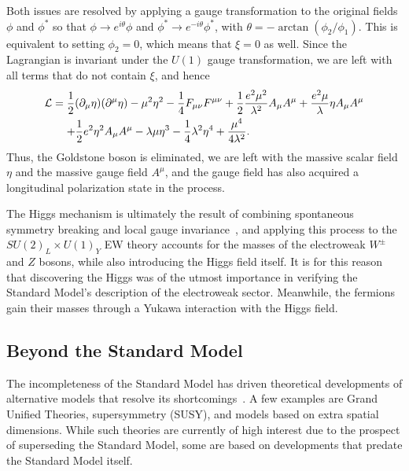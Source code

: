 Both issues are resolved by applying a gauge transformation to the original fields $\phi$ and $\phi^*$ so that $\phi\to e^{i\theta}\phi$ and $\phi^*\to e^{-i\theta}\phi^*$, with $\theta=-\arctan(\phi_2/\phi_1)$.
This is equivalent to setting $\phi_2=0$, which means that $\xi=0$ as well.
Since the Lagrangian is invariant under the $U(1)$ gauge transformation, we are left with all terms that do not contain $\xi$, and hence
\begin{equation}
  \begin{aligned}
    \mathcal{L} &= \frac{1}{2}(\partial_\mu\eta)(\partial^\mu\eta)-\mu^2\eta^2-\frac{1}{4}F_{\mu\nu}F^{\mu\nu}+\frac{1}{2}\frac{e^2\mu^2}{\lambda^2}A_\mu A^\mu+\frac{e^2\mu}{\lambda}\eta A_\mu A^\mu\\
    &\equad+ \frac{1}{2}e^2\eta^2A_\mu A^\mu-\lambda\mu\eta^3-\frac{1}{4}\lambda^2\eta^4+\frac{\mu^4}{4\lambda^2}.
  \end{aligned}
\end{equation}
Thus, the Goldstone boson is eliminated, we are left with the massive scalar field $\eta$ and the massive gauge field $A^\mu$, and the gauge field has also acquired a longitudinal polarization state in the process.

The Higgs mechanism is ultimately the result of combining spontaneous symmetry breaking and local gauge invariance~\cite{Higgs:1964ia}, and applying this process to the $SU(2)_L\times U(1)_Y$ EW theory accounts for the masses of the electroweak $W^\pm$ and $Z$ bosons, while also introducing the Higgs field itself.
It is for this reason that discovering the Higgs was of the utmost importance in verifying the Standard Model's description of the electroweak sector.
Meanwhile, the fermions gain their masses through a Yukawa interaction with the Higgs field. %

\subsection{Beyond the Standard Model}
\label{subsec:BSM}

The incompleteness of the Standard Model has driven theoretical developments of alternative models that resolve its shortcomings~\cite{2010arXiv1005.1676L}.
A few examples are Grand Unified Theories, supersymmetry (SUSY), and models based on extra spatial dimensions.
While such theories are currently of high interest due to the prospect of superseding the Standard Model, some are based on developments that predate the Standard Model itself.

